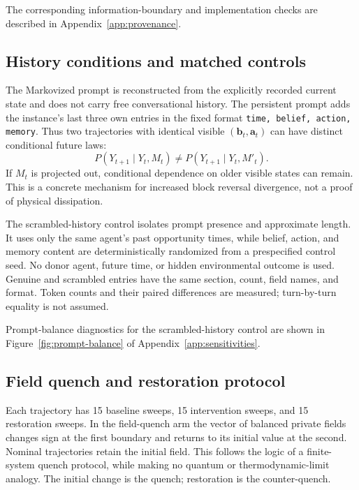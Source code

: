 \documentclass[12pt]{article}
\begin{document}
The corresponding information-boundary and implementation checks are described in Appendix~\ref{app:provenance}.

\subsection{History conditions and matched controls}
\label{sec:history-conditions}

The Markovized prompt is reconstructed from the explicitly recorded current
state and does not carry free conversational history.  The persistent prompt
adds the instance's last three own entries in the fixed format
\texttt{time, belief, action, memory}.  Thus two trajectories with identical
visible $(\bm b_t,\bm a_t)$ can have distinct conditional future laws:
\begin{equation}
P(Y_{t+1}\mid Y_t,M_t)\ne P(Y_{t+1}\mid Y_t,M'_t).
\end{equation}
If $M_t$ is projected out, conditional dependence on older visible states can
remain.  This is a concrete mechanism for increased block reversal divergence,
not a proof of physical dissipation.

The scrambled-history control isolates prompt presence and approximate
length.  It uses only the same agent's past opportunity times, while belief,
action, and memory content are deterministically randomized from a prespecified
control seed.  No donor agent, future time, or hidden environmental outcome is
used.  Genuine and scrambled entries have the same section, count, field
names, and format.  Token counts and their paired differences are measured;
turn-by-turn equality is not assumed.

Prompt-balance diagnostics for the scrambled-history control are shown in Figure~\ref{fig:prompt-balance} of Appendix~\ref{app:sensitivities}.

\subsection{Field quench and restoration protocol}
\label{sec:quench-protocol}

Each trajectory has 15 baseline sweeps, 15 intervention sweeps, and 15
restoration sweeps.  In the field-quench arm the vector of balanced private
fields changes sign at the first boundary and returns to its initial value at
the second.  Nominal trajectories retain the initial field.  This follows the
logic of a finite-system quench protocol, while making no quantum or
thermodynamic-limit analogy.  The initial
change is the quench; restoration is the counter-quench.
\end{document}
